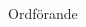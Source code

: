 \documentclass[../_main/handlingar.tex]{subfiles}
\begin{document}


\begin{signatures}{1}
    \mvh
    \signature{\ordf}{Ordförande}
\end{signatures}
\end{document}
